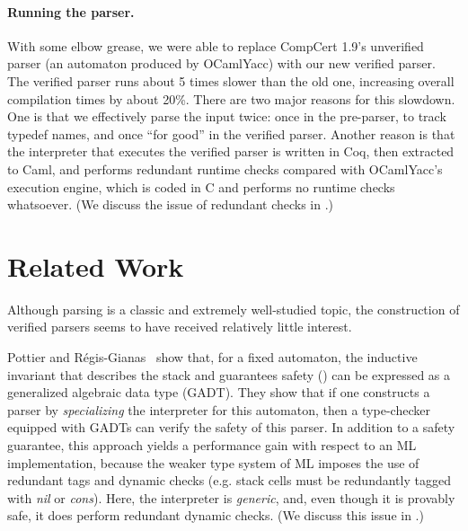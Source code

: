 \documentclass{llncs}
\begin{document}
\paragraph{Running the parser.}  With some elbow grease, we were able
to replace CompCert 1.9's unverified parser (an \lalr automaton
produced by OCamlYacc) with our new verified parser.  The verified parser
runs about 5 times slower than the old one, increasing overall
compilation times by about 20\%.  There are two major reasons for this
slowdown.  One is that we effectively parse the input twice: once in
the pre-parser, to track typedef names, and once ``for good'' in the
verified parser.  Another reason is that the interpreter that
executes the verified parser is written in Coq, then extracted to
Caml, and performs redundant runtime checks compared with OCamlYacc's
execution engine, which is coded in C and performs no runtime checks
whatsoever. (We discuss the issue of redundant checks in .)

\section{Related Work}
\label{sec:related}

Although parsing is a classic and extremely well-studied topic, the construction of
verified parsers seems to have received relatively little interest.

Pottier and Régis-Gianas~\citeyear{pottier-regis-gianas-typed-lr} show that,
for a fixed \lrone automaton, the inductive invariant that describes the stack
and guarantees safety () can be expressed as a generalized
algebraic data type (GADT). They show that if one constructs a parser by
\emph{specializing} the interpreter for this automaton, then a type-checker
equipped with GADTs can verify the safety of this parser.
%
In addition to a safety guarantee, this approach yields a performance gain
with respect to an ML implementation, because the weaker type system of ML
imposes the use of redundant tags and dynamic checks (e.g. stack cells must
be redundantly tagged with \textit{nil} or \textit{cons}).
%
%
%
Here, the interpreter is \emph{generic}, and, even though it is provably safe,
it does perform redundant dynamic checks. (We discuss this issue
in .)
\end{document}
